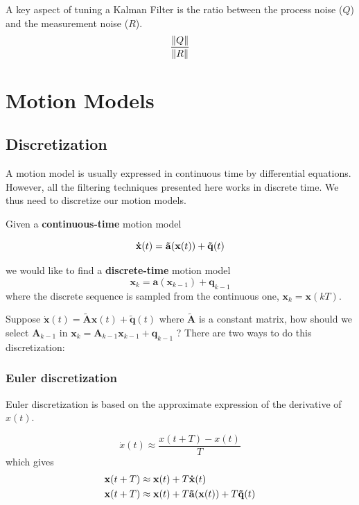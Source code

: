 A key aspect of tuning a Kalman Filter is the ratio between the process noise ($Q$) and the measurement noise ($R$).
\begin{equation}
    \frac{\left\lVert Q\right\rVert}{\left\lVert R\right\rVert}
\end{equation}

\section{Motion Models}

\subsection{Discretization}
A motion model is usually expressed in continuous time by differential equations. However, all the filtering techniques presented here works in discrete time. We thus need to discretize our motion models.

Given a \textbf{continuous-time} motion model

\begin{equation}
    \mathbf{\dot{x}}(t) = \mathbf{\Tilde{a}}(\mathbf{x}(t)) + \mathbf{\Tilde{q}}(t)
\end{equation}

we would like to find a \textbf{discrete-time} motion model
\begin{equation}
    \mathbf{x}_k = \mathbf{a}(\mathbf{x}_{k-1}) + \mathbf{q}_{k-1}
\end{equation}
where the discrete sequence is sampled from the continuous one, $\mathbf{x}_k = \mathbf{x}(kT)$.


Suppose $\mathbf{\dot{x}}(t) = \mathbf{\tilde{A}}\mathbf{x}(t) + \mathbf{\tilde{q}}(t)$ where $\mathbf{\tilde{A}}$ is a constant matrix, how should we select $\mathbf{A}_ {k-1}$ in $\mathbf{x}_k = \mathbf{A}_{k-1} \mathbf{x}_{k-1} + \mathbf{q}_{k-1}$ ? There are two ways to do this discretization:

\subsubsection{Euler discretization}

Euler discretization is based on the approximate expression of the derivative of $x(t)$.

\begin{equation}
    \dot{x}(t) \approx \frac{x(t+T)-x(t)}{T}
\end{equation}
which gives
\begin{align}
    \mathbf{x}(t+T) & \approx \mathbf{x}(t) + T \mathbf{\dot{x}}(t) \\
     \mathbf{x}(t+T)  & \approx \mathbf{x}(t) + T \mathbf{\Tilde{a}}(\mathbf{x}(t)) + T \mathbf{\Tilde{q}}(t)
\end{align}

